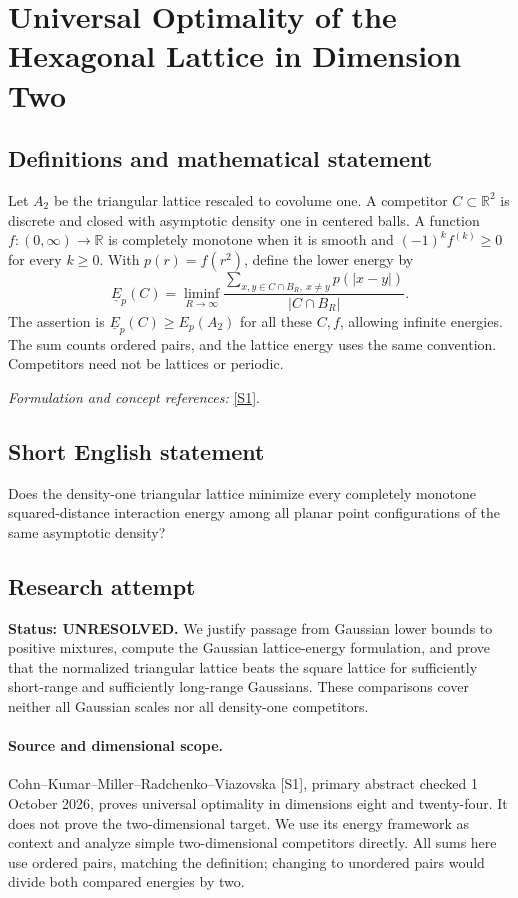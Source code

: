 \documentclass[11pt]{article}
\begin{document}
\section*{\texorpdfstring{Universal Optimality of the Hexagonal Lattice in Dimension Two}{Universal Optimality of the Hexagonal Lattice in Dimension Two}}\label{statement}
\subsection{Definitions and mathematical statement}
Let $A_2$ be the triangular lattice rescaled to covolume one. A competitor $C\subset{\mathbb{R}}^2$ is discrete and closed with asymptotic density one in centered balls. A function $f:(0,\infty)\to{\mathbb{R}}$ is completely monotone when it is smooth and $(-1)^kf^{(k)}\ge0$ for every $k\ge0$. With $p(r)=f(r^2)$, define the lower energy by
\[
 \underline E_p(C)=\liminf_{R\to\infty}
 \frac{\sum_{x,y\in C\cap B_R,\ x\ne y}p(|x-y|)}{|C\cap B_R|}.
\]
The assertion is $\underline E_p(C)\ge E_p(A_2)$ for all these $C,f$, allowing infinite energies. The sum counts ordered pairs, and the lattice energy uses the same convention. Competitors need not be lattices or periodic.
\par\smallskip\textit{Formulation and concept references:} \href{https://arxiv.org/abs/1902.05438}{[S1]}.

\subsection{Short English statement}
Does the density-one triangular lattice minimize every completely monotone squared-distance interaction energy among all planar point configurations of the same asymptotic density?
\subsection{Research attempt}
\textbf{Status: UNRESOLVED.} We justify passage from Gaussian lower bounds to positive mixtures, compute the Gaussian lattice-energy formulation, and prove that the normalized triangular lattice beats the square lattice for sufficiently short-range and sufficiently long-range Gaussians. These comparisons cover neither all Gaussian scales nor all density-one competitors.

\paragraph{Source and dimensional scope.}
Cohn--Kumar--Miller--Radchenko--Viazovska [S1], primary abstract checked 1 October 2026, proves universal optimality in dimensions eight and twenty-four. It does not prove the two-dimensional target. We use its energy framework as context and analyze simple two-dimensional competitors directly. All sums here use ordered pairs, matching the definition; changing to unordered pairs would divide both compared energies by two.
\end{document}
